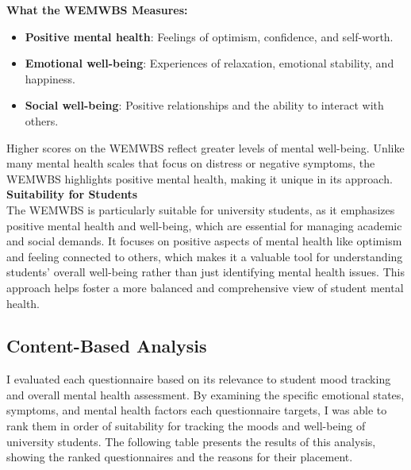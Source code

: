 \noindent \textbf{What the WEMWBS Measures:}
\begin{itemize}
    \item \textbf{Positive mental health}: Feelings of optimism, confidence, and self-worth.
    \item \textbf{Emotional well-being}: Experiences of relaxation, emotional stability, and happiness.
    \item \textbf{Social well-being}: Positive relationships and the ability to interact with others.
\end{itemize}
Higher scores on the WEMWBS reflect greater levels of mental well-being. Unlike many mental health scales that focus on distress or negative symptoms, the WEMWBS highlights positive mental health, making it unique in its approach.\vspace{5mm} \\
\noindent \textbf{Suitability for Students} \\
The WEMWBS is particularly suitable for university students, as it emphasizes positive mental health and well-being, which are essential for managing academic and social demands. It focuses on positive aspects of mental health like optimism and feeling connected to others, which makes it a valuable tool for understanding students' overall well-being rather than just identifying mental health issues. This approach helps foster a more balanced and comprehensive view of student mental health.

\subsection{Content-Based Analysis}

I evaluated each questionnaire based on its relevance to student mood tracking and overall mental health assessment. By examining the specific emotional states, symptoms, and mental health factors each questionnaire targets, I was able to rank them in order of suitability for tracking the moods and well-being of university students. The following table presents the results of this analysis, showing the ranked questionnaires and the reasons for their placement.\vspace{5mm}

